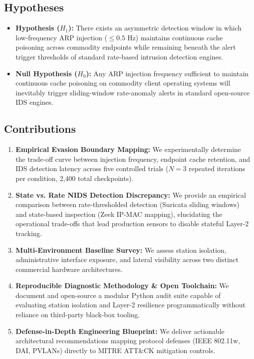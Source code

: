 \documentclass[conference]{IEEEtran}
\begin{document}
\subsection{Hypotheses}
\begin{itemize}
    \item \textbf{Hypothesis ($H_1$):} There exists an asymmetric detection window in which low-frequency ARP injection ($\le 0.5\text{ Hz}$) maintains continuous cache poisoning across commodity endpoints while remaining beneath the alert trigger thresholds of standard rate-based intrusion detection engines.
    \item \textbf{Null Hypothesis ($H_0$):} Any ARP injection frequency sufficient to maintain continuous cache poisoning on commodity client operating systems will inevitably trigger sliding-window rate-anomaly alerts in standard open-source IDS engines.
\end{itemize}

\subsection{Contributions}
\begin{enumerate}
    \item \textbf{Empirical Evasion Boundary Mapping:} We experimentally determine the trade-off curve between injection frequency, endpoint cache retention, and IDS detection latency across five controlled trials ($N = 3$ repeated iterations per condition, 2,400 total checkpoints).
    \item \textbf{State vs. Rate NIDS Detection Discrepancy:} We provide an empirical comparison between rate-thresholded detection (Suricata sliding windows) and state-based inspection (Zeek IP-MAC mapping), elucidating the operational trade-offs that lead production sensors to disable stateful Layer-2 tracking.
    \item \textbf{Multi-Environment Baseline Survey:} We assess station isolation, administrative interface exposure, and lateral visibility across two distinct commercial hardware architectures.
    \item \textbf{Reproducible Diagnostic Methodology \& Open Toolchain:} We document and open-source a modular Python audit suite capable of evaluating station isolation and Layer-2 resilience programmatically without reliance on third-party black-box tooling.
    \item \textbf{Defense-in-Depth Engineering Blueprint:} We deliver actionable architectural recommendations mapping protocol defenses (IEEE 802.11w, DAI, PVLANs) directly to MITRE ATT\&CK mitigation controls.
\end{enumerate}
\end{document}

